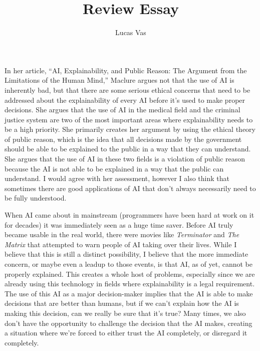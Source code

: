 \documentclass[12pt]{article}
\title{Review Essay}
\author{Lucas Vas}
\date{}
\begin{document}
    \maketitle
    In her article, ``AI, Explainability, and Public Reason: The Argument from the Limitations of the Human Mind,''
    Maclure argues not that the use of AI is inherently bad, but that there are some serious ethical concerns that
    need to be addressed about the explainability of every AI before it's used to make proper decisions. She argues
    that the use of AI in the medical field and the criminal justice system are two of the most important areas
    where explainability needs to be a high priority. She primarily creates her argument by using the ethical theory
    of public reason, which is the idea that all decisions made by the government should be able to be explained to
    the public in a way that they can understand. She argues that the use of AI in these two fields is a violation
    of public reason because the AI is not able to be explained in a way that the public can understand. I would 
    agree with her assessment, however I also think that sometimes there are good applications of AI that don't always
    necessarily need to be fully understood.

    When AI came about in mainstream (programmers have been hard at work on it for decades) it was immediately seen as
    a huge time saver. Before AI truly became usable in the real world, there were movies like \textit{Terminator} and
    \textit{The Matrix} that attempted to warn people of AI taking over their lives. While I believe that this is still
    a distinct possibility, I believe that the more immediate concern, or maybe even a leadup to those events, is that
    AI, as of yet, cannot be properly explained. This creates a whole host of problems, especially since we are 
    already using this technology in fields where explainability is a legal requirement. The use of this AI as a major
    decision-maker implies that the AI is able to make decisions that are better than humans, but if we can't explain
    how the AI is making this decision, can we really be sure that it's true? Many times, we also don't have the
    opportunity to challenge the decision that the AI makes, creating a situation where we're forced to either trust
    the AI completely, or disregard it completely.
\end{document}
